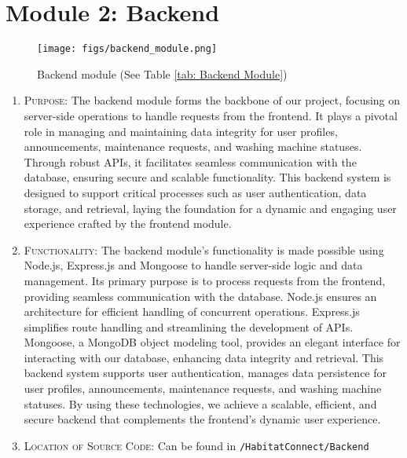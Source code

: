 \documentclass[conference]{IEEEtran}
\begin{document}
\section*{Module 2: Backend}
    \begin{figure}[H]
    \centering
    \texttt{[image: figs/backend\_module.png]}
    \caption{Backend module (See Table \ref{tab: Backend Module})}
    \label{fig:Backend module}
    \end{figure}
    
\begin{enumerate}
    \item \textsc{Purpose:} The backend module forms the backbone of our project, focusing on server-side operations to handle requests from the frontend. It plays a pivotal role in managing and maintaining data integrity for user profiles, announcements, maintenance requests, and washing machine statuses. Through robust APIs, it facilitates seamless communication with the database, ensuring secure and scalable functionality. This backend system is designed to support critical processes such as user authentication, data storage, and retrieval, laying the foundation for a dynamic and engaging user experience crafted by the frontend module.

    \item \textsc{Functionality:} The backend module’s functionality is made possible using Node.js, Express.js and Mongoose to handle server-side logic and data management. Its primary purpose is to process requests from the frontend, providing seamless communication with the database. Node.js ensures an architecture for efficient handling of concurrent operations. Express.js simplifies route handling and streamlining the development of APIs. Mongoose, a MongoDB object modeling tool, provides an elegant interface for interacting with our database, enhancing data integrity and retrieval. This backend system supports user authentication, manages data persistence for user profiles, announcements, maintenance requests, and washing machine statuses. By using these technologies, we achieve a scalable, efficient, and secure backend that complements the frontend's dynamic user experience.

    \item \textsc{Location of Source Code:} Can be found in \texttt{/HabitatConnect/Backend}


\end{enumerate}
\end{document}
